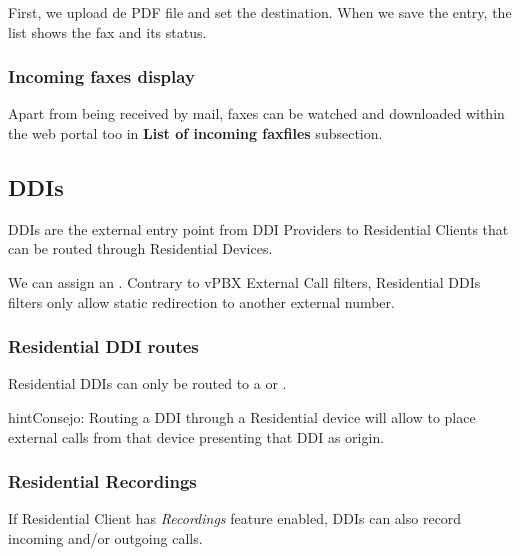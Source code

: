 \documentclass[letterpaper,10pt,spanish]{sphinxmanual}
\begin{document}
First, we upload de PDF file and set the destination. When we save the entry, the list shows the fax and its status.


\subsubsection{Incoming faxes display}
\label{administration_portal/client/residential/faxes:incoming-faxes-display}
Apart from being received by mail, faxes can be watched and downloaded within
the web portal too in \textbf{List of incoming faxfiles} subsection.


\subsection{DDIs}
\label{administration_portal/client/residential/ddis:ddis}\label{administration_portal/client/residential/ddis:residential-ddis}\label{administration_portal/client/residential/ddis::doc}
DDIs are the external entry point from DDI Providers to Residential Clients that
can be routed through Residential Devices.

We can assign an {\hyperref[administration_portal/client/vpbx/routing_tools/external_call_filters:external\string-call\string-filters]{}}. Contrary to vPBX External Call filters, Residential DDIs
filters only allow static redirection to another external number.


\subsubsection{Residential DDI routes}
\label{administration_portal/client/residential/ddis:residential-ddi-routes}
Residential DDIs can only be routed to a {\hyperref[administration_portal/client/residential/residential_devices:residential\string-devices]{}}
or {\hyperref[administration_portal/client/vpbx/faxes:faxing\string-system]{}}.

\begin{notice}{hint}{Consejo:}
Routing a DDI through a Residential device will allow to place external calls
from that device presenting that DDI as origin.
\end{notice}


\subsubsection{Residential Recordings}
\label{administration_portal/client/residential/ddis:residential-recordings}
If Residential Client has \emph{Recordings} feature enabled, DDIs can also record incoming and/or
outgoing calls.
\end{document}
